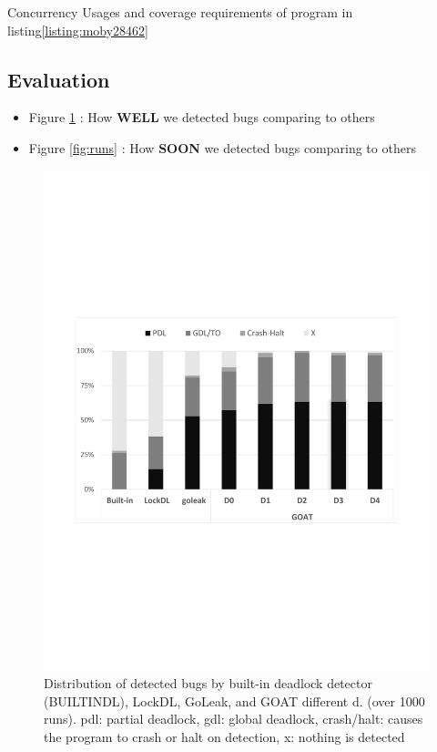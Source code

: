 \begin{table}[]
\centering
\caption{Concurrency Usages and coverage requirements of program in listing\ref{listing:moby28462}}
\scalebox{0.9}{

}
\label{tab:moby_cov_table}
\end{table}


\subsection{Evaluation}

\begin{itemize}
  \item Figure \ref{fig:detection} : How \textbf{WELL} we detected bugs comparing to others
  \item Figure \ref{fig:runs} : How \textbf{SOON} we detected bugs comparing to others
\end{itemize}



\begin{figure}
\centering
  \includegraphics[width=.95\linewidth]{figs/P4_detections.pdf}
  \caption{Distribution of detected bugs by built-in deadlock detector (BUILTINDL), LockDL, GoLeak, and GOAT different d. (over 1000 runs). pdl: partial deadlock, gdl: global deadlock, crash/halt: causes the program to crash or halt on detection, x: nothing is detected }
  \label{fig:detection}
\end{figure}



